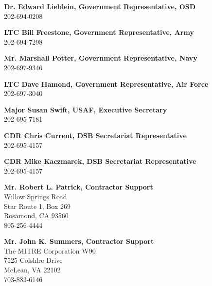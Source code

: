\documentclass[11pt,final]{article}
\begin{document}
\medskip

\textbf{Dr. Edward Lieblein, Government Representative, OSD}\\
\hspace*{2cm}202-694-0208

\textbf{LTC Bill Freestone, Government Representative, Army}\\
\hspace*{2cm}202-694-7298

\textbf{Mr. Marshall Potter, Government Representative, Navy}\\
\hspace*{2cm}202-697-9346

\textbf{LTC Dave Hamond, Government Representative, Air Force}\\
\hspace*{2cm}202-697-3040

\textbf{Major Susan Swift, USAF, Executive Secretary}\\
\hspace*{2cm}202-695-7181

\textbf{CDR Chris Current, DSB Secretariat Representative}\\
\hspace*{2cm}202-695-4157

\textbf{CDR Mike Kaczmarek, DSB Secretariat Representative}\\
\hspace*{2cm}202-695-4157

\textbf{Mr. Robert L. Patrick, Contractor Support}\\
\hspace*{2cm}Willow Springs Road\\
\hspace*{2cm}Star Route 1, Box 269\\
\hspace*{2cm}Rosamond, CA 93560\\
\hspace*{2cm}805-256-4444

\medskip

\textbf{Mr. John K. Summers, Contractor Support}\\
\hspace*{2cm}The MITRE Corporation W90\\
\hspace*{2cm}7525 Colshlre Drive\\
\hspace*{2cm}McLean, VA 22102\\
\hspace*{2cm}703-883-6146
\end{document}
